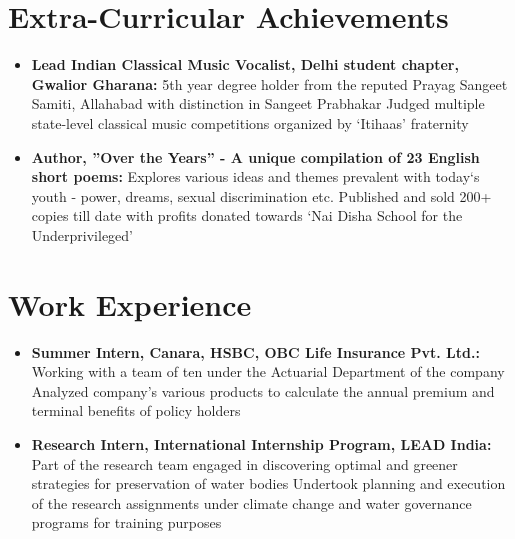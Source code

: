 \documentclass[letterpaper,10pt]{article}
\newcommand{\resumeSubHeadingListStart}{\begin{itemize}[leftmargin=*]}
\newcommand{\resumeSubHeadingListEnd}{\end{itemize}}
\newcommand{\shorterSection}[1]{\vspace{-10pt}\section{#1}}
\begin{document}
\shorterSection{Extra-Curricular Achievements}
  \resumeSubHeadingListStart
  \small
    \item{
     \textbf{Lead Indian Classical Music Vocalist, Delhi student chapter, Gwalior Gharana:}\newline
     {5th year degree holder from the reputed Prayag Sangeet Samiti, Allahabad with distinction in Sangeet Prabhakar}\newline
     {Judged multiple state-level classical music competitions organized by \lq Itihaas' fraternity}
       \hfill}
    \vspace{-5pt}
    \item{
     \textbf{Author, ''Over the Years'' - A unique compilation of 23 English short poems:}\newline
     {Explores various ideas and themes prevalent with today\lq s youth - power, dreams, sexual discrimination etc.}\newline
     {Published and sold 200+ copies till date with profits donated towards \lq Nai Disha School for the Underprivileged'}
     
     }
  \resumeSubHeadingListEnd

\shorterSection{Work Experience}
  \resumeSubHeadingListStart
    \small
    \item{
     \textbf{Summer Intern, Canara, HSBC, OBC Life Insurance Pvt. Ltd.:}\newline
     {Working with a team of ten under the Actuarial Department of the company}\newline
     {Analyzed company's various products to calculate the annual premium and terminal benefits of policy holders}
    \hfill}
    \vspace{-5pt}
    \item{
    \textbf{Research Intern, International Internship Program, LEAD India:}\newline
    {Part of the research team engaged in discovering optimal and greener strategies for preservation of water bodies}\newline
    {Undertook planning and execution of the research assignments under climate change and water governance programs for
training purposes}
     
     }
  \resumeSubHeadingListEnd
\end{document}
